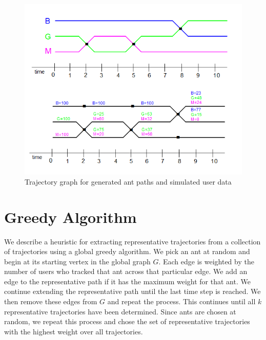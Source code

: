 \documentclass[12pt]{article}
\begin{document}
\begin{figure}[h!]
\centering
\includegraphics[width=4.5in]{GDataPlot4.png}
\caption{Trajectory graph for generated ant paths and simulated user data}
\label{fig:antData}
\end{figure}




\section{Greedy Algorithm}
We describe a heuristic for extracting representative trajectories from a collection of trajectories using a global greedy algorithm. We pick an ant at random and begin at its starting vertex in the global graph $G$. Each edge is weighted by the number of users who tracked that ant across that particular edge. We add an edge to the representative path if it has the maximum weight for that ant. We continue extending the representative path until the last time step is reached. We then remove these edges from $G$ and repeat the process. This continues until all $k$ representative trajectories have been determined. Since ants are chosen at random, we repeat this process and chose the set of representative trajectories with the highest weight over all trajectories.
\end{document}
